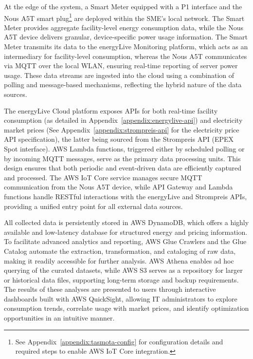 At the edge of the system, a Smart Meter equipped with a P1 interface and the Nous A5T smart plug\footnote{See Appendix~\ref{appendix:tasmota-config} for configuration details and required steps to enable AWS IoT Core integration.} are deployed within the SME's local network. The Smart Meter provides aggregate facility-level energy consumption data, while the Nous A5T device delivers granular, device-specific power usage information. The Smart Meter transmits its data to the energyLive Monitoring platform, which acts as an intermediary for facility-level consumption, whereas the Nous A5T communicates via MQTT over the local WLAN, ensuring real-time reporting of server power usage. These data streams are ingested into the cloud using a combination of polling and message-based mechanisms, reflecting the hybrid nature of the data sources.

The energyLive Cloud platform exposes APIs for both real-time facility consumption (as detailed in Appendix~\ref{appendix:energylive-api}) and electricity market prices (See Appendix~\ref{appendix:strompreis-api} for the electricity price API specification), the latter being sourced from the Strompreis API (EPEX Spot interface). AWS Lambda functions, triggered either by scheduled polling or by incoming MQTT messages, serve as the primary data processing units. This design ensures that both periodic and event-driven data are efficiently captured and processed. The AWS IoT Core service manages secure MQTT communication from the Nous A5T device, while API Gateway and Lambda functions handle RESTful interactions with the energyLive and Strompreis APIs, providing a unified entry point for all external data sources.

All collected data is persistently stored in AWS DynamoDB, which offers a highly available and low-latency database for structured energy and pricing information. To facilitate advanced analytics and reporting, AWS Glue Crawlers and the Glue Catalog automate the extraction, transformation, and cataloging of raw data, making it readily accessible for further analysis. AWS Athena enables ad hoc querying of the curated datasets, while AWS S3 serves as a repository for larger or historical data files, supporting long-term storage and backup requirements. The results of these analyses are presented to users through interactive dashboards built with AWS QuickSight, allowing IT administrators to explore consumption trends, correlate usage with market prices, and identify optimization opportunities in an intuitive manner.

